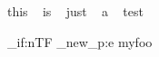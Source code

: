 \documentclass{article}
\begin{document}
 this ~  is ~ just ~ a  ~ test
 
 \bool_if:nTF { \starray_new_p:e {myfoo} }
  {  }
  {  }

 
 
 
\end{document}
